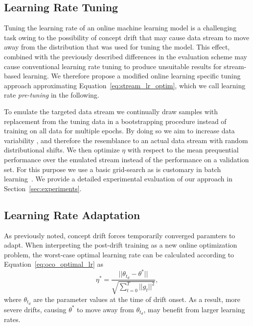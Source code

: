 \documentclass[letterpaper]{article} %
\begin{document}
\subsection{Learning Rate Tuning}\label{subsec:pre-tuning}

Tuning the learning rate of an online machine learning model is a challenging task owing to the possibility of concept drift that may cause data stream to move away from the distribution that was used for tuning the model.
This effect, combined with the previously described differences in the evaluation scheme may cause conventional learning rate tuning to produce unsuitable results for stream-based learning.
We therefore propose a modified online learning specific tuning approach approximating Equation~\eqref{eq:stream_lr_optim}, which we call learning rate \textit{pre-tuning} in the following.

To emulate
the targeted data stream we continually draw samples with replacement from the tuning data in a bootstrapping procedure instead of training on all data for multiple epochs.
By doing so we aim to increase data variability%
, and therefore the resemblance to an actual data stream with random distributional shifts.
We then optimize $\eta$ with respect to the mean prequential performance over the emulated stream instead of the performance on a validation set.
For this purpose we use a basic grid-search as is customary in batch learning~\cite{defazioLearningRateFreeLearningDAdaptation2023a}.
We provide a detailed experimental evaluation of our approach in Section~\ref{sec:experiments}.

\subsection{Learning Rate Adaptation}

As previously noted, concept drift forces temporarily converged paramters to adapt.
When interpreting the post-drift training as a new online optimization problem, the worst-case optimal learning rate can be calculated according to Equation~\ref{eq:oco_optimal_lr} as
\begin{equation}
	\eta^* = \frac{||\theta_{t_d} - \theta^*||}{\sqrt{\sum_{t=0}^{T} ||g_t||^2}},
\end{equation}
where $\theta_{t_d}$ are the parameter values at the time of drift onset.
As a result, more severe drifts, causing $\theta^*$ to move away from $\theta_{t_d}$, may benefit from larger learning rates.
\end{document}
